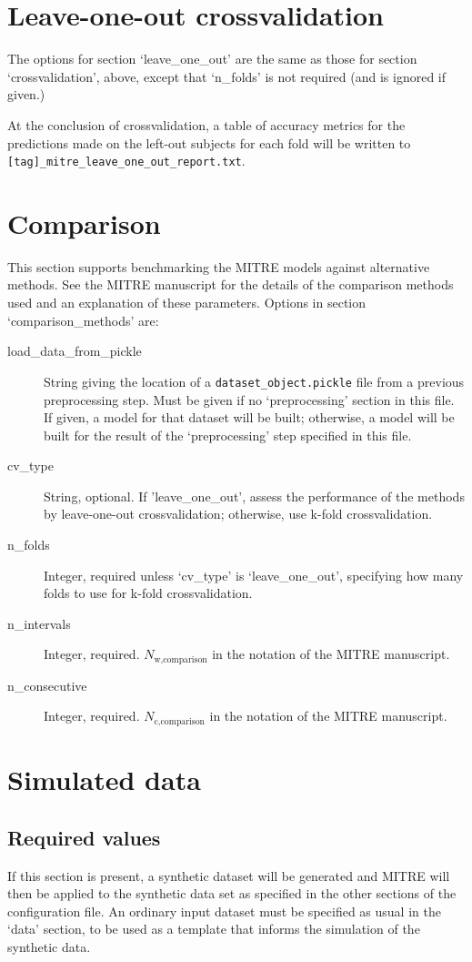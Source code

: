 \documentclass[12pt]{report}
\begin{document}
\section{Leave-one-out crossvalidation}\label{leave_one_out}
The options for section `leave\_one\_out' are the same as those for
section `crossvalidation', above, except that `n\_folds' is not
required (and is ignored if given.)

At the conclusion of crossvalidation, a table of accuracy metrics for
the predictions made on the left-out subjects for each fold will be
written to \texttt{[tag]\_mitre\_leave\_one\_out\_report.txt}.


\section{Comparison}\label{comparison_methods}
This section supports benchmarking the MITRE models against
alternative methods.  See the MITRE manuscript for the details of the
comparison methods used and an explanation of these parameters.  Options
in section `comparison\_methods' are:
\begin{description}
\item[load\_data\_from\_pickle] String giving the location of a
  \texttt{dataset\_object.pickle} file from a previous preprocessing
  step. Must be given if no `preprocessing' section in this file. If
  given, a model for that dataset will be built; otherwise, a model
  will be built for the result of the `preprocessing' step specified
  in this file.
\item[cv\_type] String, optional. If 'leave\_one\_out', assess the performance
  of the methods by leave-one-out crossvalidation; otherwise,
  use k-fold crossvalidation.
\item[n\_folds] Integer, required unless `cv\_type' is `leave\_one\_out',
  specifying how many folds to use for k-fold crossvalidation.
\item[n\_intervals] Integer, required. $N_\text{w,comparison}$ in the
  notation of the MITRE manuscript.
\item[n\_consecutive] Integer, required. $N_\text{c,comparison}$ in
  the notation of the MITRE manuscript.
\end{description}

\section{Simulated data}\label{simulated_data}
\subsection{Required values}\label{simulated_data_required}
If this section is present, a synthetic dataset will be generated and
MITRE will then be applied to the synthetic data set as specified in
the other sections of the configuration file. An ordinary input
dataset must be specified as usual in the `data' section, to be used
as a template that informs the simulation of the synthetic data.
\end{document}
